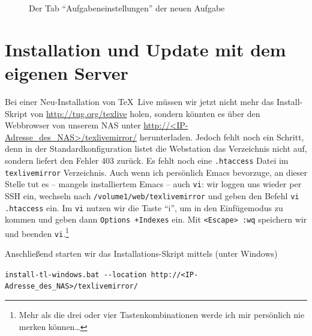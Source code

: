 \documentclass{dtk}
\begin{document}
\begin{figure}
\begin{center}
\caption{Der Tab \enquote{Aufgabeneinstellungen} der neuen Aufgabe}\label{fig:task2}
\end{center}
\end{figure}

\section{Installation und Update mit dem eigenen Server}

Bei einer Neu-Installation von \TeX~Live müssen wir jetzt nicht mehr das Install-Skript von \url{http://tug.org/texlive} holen, sondern könnten es über den Webbrowser von unserem NAS unter \url{http://<IP-Adresse_des_NAS>/texlivemirror/} herunterladen. Jedoch fehlt noch ein Schritt, denn in der Standardkonfiguration listet die Webstation das Verzeichnis nicht auf, sondern liefert den Fehler 403 zurück. Es fehlt noch eine \texttt{.htaccess} Datei im \texttt{texlivemirror} Verzeichnis. Auch wenn ich persönlich Emacs bevorzuge, an dieser Stelle tut es -- mangels installiertem Emacs -- auch \texttt{vi}: wir loggen uns wieder per SSH ein, wechseln nach \texttt{/volume1/web/texlivemirror} und geben den Befehl \texttt{vi .htaccess} ein. Im \texttt{vi} nutzen wir die Taste \enquote{i}, um in den Einfügemodus zu kommen und geben dann \texttt{Options +Indexes} ein. Mit \texttt{<Escape> :wq} speichern wir und beenden \texttt{vi}.\footnote{Mehr als die drei oder vier Tastenkombinationen werde ich mir persönlich nie merken können\ldots} 

Anschließend starten wir das Installations-Skript mittels (unter Windows)  

{\footnotesize \verb|install-tl-windows.bat --location http://<IP-Adresse_des_NAS>/texlivemirror/|} 
\end{document}

